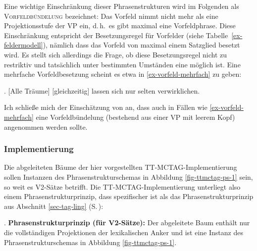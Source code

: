Eine wichtige Einschränkung dieser Phrasenstrukturen wird im Folgenden als \textsc{Vorfeldbündelung} bezeichnet: Das Vorfeld nimmt nicht mehr als eine Projektionsstufe der VP ein, d.\,h.\ es gibt maximal eine Vorfeldphrase. Diese Einschränkung entspricht der  Besetzungsregel für Vorfelder (siehe Tabelle~\ref{ex-feldermodell}), nämlich dass das Vorfeld von maximal einem Satzglied besetzt wird. Es stellt sich allerdings die Frage, ob diese Besetzungsregel nicht zu restriktiv und tatsächlich unter bestimmten Umständen eine  möglich ist. Eine mehrfache Vorfeldbesetzung scheint es etwa in \ref{ex-vorfeld-mehrfach} zu geben:

\ex.  [Alle Träume] [gleichzeitig] lassen sich nur selten verwirklichen.\\
\citep[(3b)]{Mueller:05b}\label{ex-vorfeld-mehrfach}

Ich schließe mich der Einschätzung von \cite{Mueller:03,Mueller:05b} an, dass auch in Fällen wie \ref{ex-vorfeld-mehrfach} eine Vorfeldbündelung (bestehend aus einer VP mit leerem Kopf) angenommen werden sollte.


\subsubsection*{Implementierung}

Die abgeleiteten Bäume der hier vorgestellten TT-MCTAG-Implementierung sollen Instanzen des Phrasenstrukturschemas in Abbildung \ref{fig-ttmctag-ps-1} sein, so weit es V2-Sätze betrifft. Die TT-MCTAG-Implementierung unterliegt also einem Phrasenstrukturprinzip, dass spezifischer ist als das Phrasenstrukturprinzip aus Abschnitt \ref{sec-tag-ling} (S.\,\pageref{ex-psprinzip-1}):

\ex. \label{ex-psprinzip} {\bf Phrasenstrukturprinzip (für V2-Sätze):}
Der abgeleitete Baum enthält nur die vollständigen Projektionen der lexikalischen Anker und ist eine Instanz des Phrasenstrukturschemas in Abbildung \ref{fig-ttmctag-ps-1}. 

